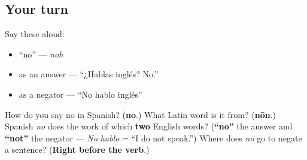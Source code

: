 \subsection*{Your turn}
Say these aloud:

\begin{itemize}
\raggedright
  \item \textquotedblleft{}no\textquotedblright{} — \emph{noh}
  \item as an answer — \textquotedblleft{}¿Hablas inglés? No.\textquotedblright{}
  \item as a negator — \textquotedblleft{}No hablo inglés\textquotedblright{}
\end{itemize}

\begin{tcolorbox}[breakable,colback=teal!4,colframe=teal!35!black,title={Before you move on}]
How do you say no in Spanish? (\textbf{no}.) What Latin word is it from? (\textbf{nōn}.) Spanish \emph{no} does the work of which \textbf{two} English words? (\textbf{\textquotedblleft{}no\textquotedblright{}} the answer and \textbf{\textquotedblleft{}not\textquotedblright{}} the negator — \emph{No hablo} = \textquotedblleft{}I do not speak.\textquotedblright{}) Where does \emph{no} go to negate a sentence? (\textbf{Right before the verb}.)
\end{tcolorbox}

